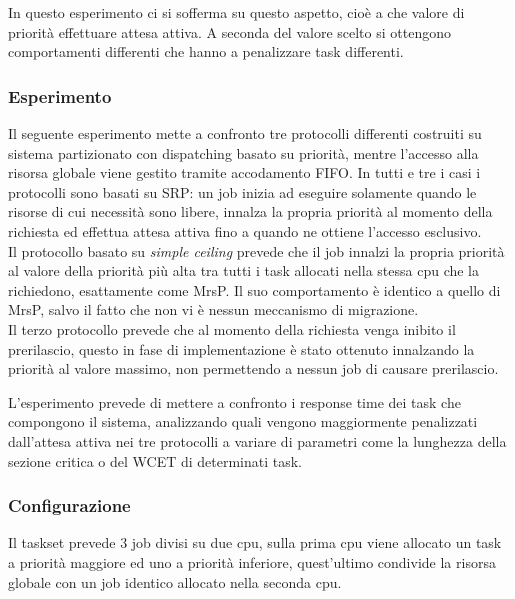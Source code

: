 \noindent In questo esperimento ci si sofferma su questo aspetto, cioè a che valore di priorità effettuare attesa attiva. A seconda del valore scelto si ottengono comportamenti differenti che hanno a penalizzare task differenti.\\

\subsubsection{Esperimento}
\label{sec:confronto_protocolli_exp}

\noindent Il seguente esperimento mette a confronto tre protocolli differenti costruiti su sistema partizionato con dispatching basato su priorità, mentre l'accesso alla risorsa globale viene gestito tramite accodamento FIFO. In tutti e tre i casi i protocolli sono basati su SRP: un job inizia ad eseguire solamente quando le risorse di cui necessità sono libere, innalza la propria priorità al momento della richiesta ed effettua attesa attiva fino a quando ne ottiene l'accesso esclusivo.\\

\noindent Il protocollo basato su \textit{simple ceiling} prevede che il job innalzi la propria priorità al valore della priorità più alta tra tutti i task allocati nella stessa cpu che la richiedono, esattamente come MrsP. Il suo comportamento è identico a quello di MrsP, salvo il fatto che non vi è nessun meccanismo di migrazione.\\

\noindent Il terzo protocollo prevede che al momento della richiesta venga inibito il prerilascio, questo in fase di implementazione è stato ottenuto innalzando la priorità al valore massimo, non permettendo a nessun job di causare prerilascio.

\noindent L'esperimento prevede di mettere a confronto i response time dei task che compongono il sistema, analizzando quali vengono maggiormente penalizzati dall'attesa attiva nei tre protocolli a variare di parametri come la lunghezza della sezione critica o del WCET di determinati task.\\

\subsubsection{Configurazione}
\label{sec:confronto_protocolli_conf}

\noindent Il taskset prevede 3 job divisi su due cpu, sulla prima cpu viene allocato un task a priorità maggiore ed uno a priorità inferiore, quest'ultimo condivide la risorsa globale con un job identico allocato nella seconda cpu.\\

